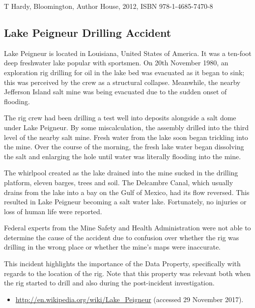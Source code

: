 T Hardy,  Bloomington, Author House, 2012, ISBN 978-1-4685-7470-8

\subsection{Lake Peigneur Drilling Accident} \label{bkm:incacc:peigneur}
Lake Peigneur is located in Louisiana, United States of America. It was a ten-foot deep freshwater lake popular with sportsmen. On 20th November 1980, an exploration rig drilling for oil in the lake bed was evacuated as it began to sink; this was perceived by the crew as a structural collapse. Meanwhile, the nearby Jefferson Island salt mine was being evacuated due to the sudden onset of flooding. 

The rig crew had been drilling a test well into deposits alongside a salt dome under Lake Peigneur. By some miscalculation, the assembly drilled into the third level of the nearby salt mine. Fresh water from the lake soon began trickling into the mine. Over the course of the morning, the fresh lake water began dissolving the salt and enlarging the hole until water was literally flooding into the mine.

The whirlpool created as the lake drained into the mine sucked in the drilling platform, eleven barges, trees and soil. The Delcambre Canal, which usually drains from the lake into a bay on the Gulf of Mexico, had its flow reversed. This resulted in Lake Peigneur becoming a salt water lake. Fortunately, no injuries or loss of human life were reported. 

Federal experts from the Mine Safety and Health Administration were not able to determine the cause of the accident due to confusion over whether the rig was drilling in the wrong place or whether the mine's maps were inaccurate.

This incident highlights the importance of the  Data Property, specifically with regards to the location of the rig. Note that this property was relevant both when the rig started to drill and also during the post-incident investigation.

\begin{samepage}
\begin{itemize}
  \item \raggedright{\href{http://en.wikipedia.org/wiki/Lake_Peigneur}{http://en.wikipedia.org/wiki/Lake\_Peigneur} (accessed 29 November 2017).}
\end{itemize}
\end{samepage}


